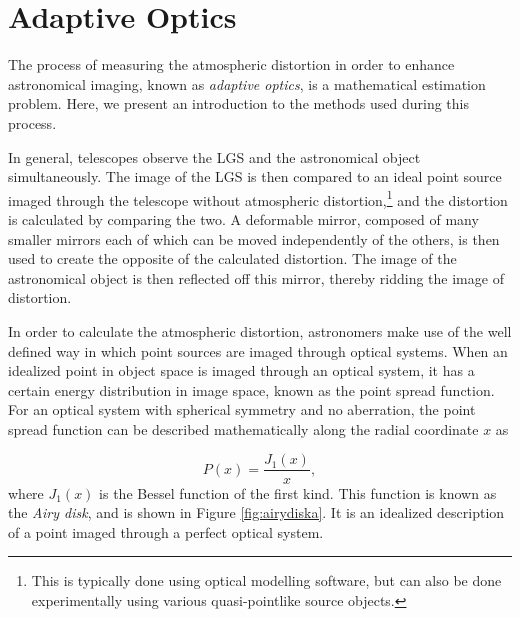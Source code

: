 
\chapter{Adaptive Optics}
The process of measuring the atmospheric distortion in order to enhance astronomical imaging, known as \textit{adaptive optics}, is a mathematical estimation problem. Here, we present an introduction to the methods used during this process.

In general, telescopes observe the LGS and the astronomical object simultaneously. The image of the LGS is then compared to an ideal point source imaged through the telescope without atmospheric distortion,\footnote{This is typically done using optical modelling software, but can also be done experimentally using various quasi-pointlike source objects.} and the distortion is calculated by comparing the two. A deformable mirror, composed of many smaller mirrors each of which can be moved independently of the others, is then used to create the opposite of the calculated distortion. The image of the astronomical object is then reflected off this mirror, thereby ridding the image of distortion.

In order to calculate the atmospheric distortion, astronomers make use of the well defined way in which point sources are imaged through optical systems. When an idealized point in object space is imaged through an optical system, it has a certain energy distribution in image space, known as the point spread function. For an optical system with spherical symmetry and no aberration, the point spread function can be described mathematically along the radial coordinate $x$ as

\begin{equation}
  P(x) = \frac{J_1(x)}{x},
  \label{psfa}
\end{equation}
%
where $J_1(x)$ is the Bessel function of the first kind. This function is known as the \textit{Airy disk}, and is shown in Figure \ref{fig:airydiska}. It is an idealized description of a point imaged through a perfect optical system.





